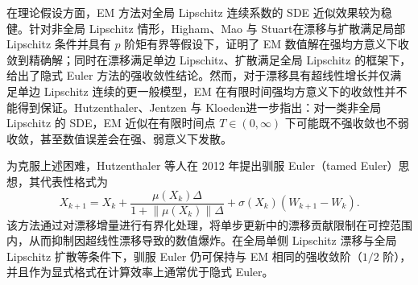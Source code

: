 在理论假设方面，EM 方法对全局 Lipschitz 连续系数的 SDE 近似效果较为稳健。针对非全局 Lipschitz 情形，Higham、Mao 与 Stuart\cite{higham2002strong}在漂移与扩散满足局部 Lipschitz 条件并具有 $p$ 阶矩有界等假设下，证明了 EM 数值解在强均方意义下收敛到精确解；同时在漂移满足单边 Lipschitz、扩散满足全局 Lipschitz 的框架下，给出了隐式 Euler 方法的强收敛性结论。然而，对于漂移具有超线性增长并仅满足单边 Lipschitz 连续的更一般模型，EM 在有限时间强均方意义下的收敛性并不能得到保证。Hutzenthaler、Jentzen 与 Kloeden\cite{hutzenthaler2011strong}进一步指出：对一类非全局 Lipschitz 的 SDE，EM 近似在有限时间点 $T\in(0,\infty)$ 下可能既不强收敛也不弱收敛，甚至数值误差会在强、弱意义下发散。

为克服上述困难，Hutzenthaler 等人在 2012 年提出驯服 Euler（tamed Euler）思想\cite{hutzenthaler2012strong}，其代表性格式为
\begin{equation}\label{eq:tamed_EM}
	X_{k+1}
	= X_{k}
	+\frac{\mu \left(X_{k}\right)\Delta}{1+\left\| \mu \left(X_{k}\right)\right\|\Delta}
	+\sigma \left(X_{k}\right)\left(W_{k+1}-W_{k}\right).
\end{equation}
该方法通过对漂移增量进行有界化处理，将单步更新中的漂移贡献限制在可控范围内，从而抑制因超线性漂移导致的数值爆炸。在全局单侧 Lipschitz 漂移与全局 Lipschitz 扩散等条件下，驯服 Euler 仍可保持与 EM 相同的强收敛阶（$1/2$ 阶），并且作为显式格式在计算效率上通常优于隐式 Euler。

